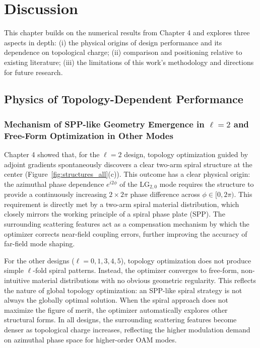 \chapter{Discussion}

\label{ch:Discussion}

This chapter builds on the numerical results from Chapter 4 and explores three aspects in depth:
 (i) the physical origins of design performance and its dependence on topological charge;
 (ii) comparison and positioning relative to existing literature;
 (iii) the limitations of this work's methodology and directions for future research.


\section{Physics of Topology-Dependent Performance}

\label{sec:physics_discussion}

\subsection{Mechanism of SPP-like Geometry Emergence in $\ell=2$ and Free-Form Optimization in Other Modes}

\label{ssec:spiral_emergence}

Chapter 4 showed that, for the $\ell = 2$ design, topology optimization guided by adjoint gradients spontaneously discovers a clear two-arm spiral structure at the center (Figure~\ref{fig:structures_all}(c)). This outcome has a clear physical origin: the azimuthal phase dependence $e^{i2\phi}$ of the LG$_{2,0}$ mode requires the structure to provide a continuously increasing $2 \times 2\pi$ phase difference across $\phi \in [0, 2\pi)$. This requirement is directly met by a two-arm spiral material distribution, which closely mirrors the working principle of a spiral phase plate (SPP). The surrounding scattering features act as a compensation mechanism by which the optimizer corrects near-field coupling errors, further improving the accuracy of far-field mode shaping.

For the other designs ($\ell = 0, 1, 3, 4, 5$), topology optimization does not produce simple $\ell$-fold spiral patterns. Instead, the optimizer converges to free-form, non-intuitive material distributions with no obvious geometric regularity. This reflects the nature of global topology optimization: an SPP-like spiral strategy is not always the globally optimal solution. When the spiral approach does not maximize the figure of merit, the optimizer automatically explores other structural forms. In all designs, the surrounding scattering features become denser as topological charge increases, reflecting the higher modulation demand on azimuthal phase space for higher-order OAM modes.

